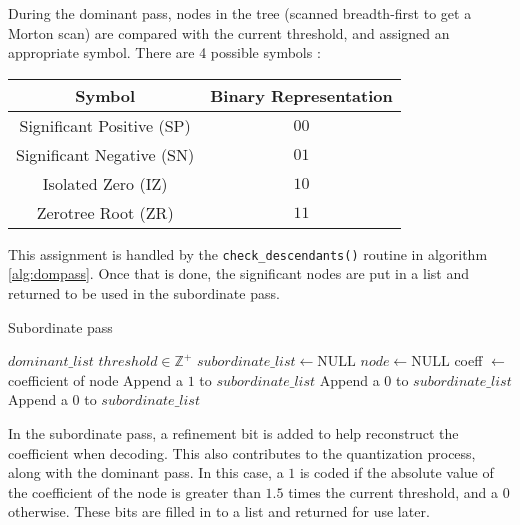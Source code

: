 \documentclass[./A14_Report.tex]{subfiles}
\begin{document}
During the dominant pass, nodes in the tree (scanned breadth-first to get a
Morton scan) are compared with the current threshold, and assigned an
appropriate symbol. There are 4 possible symbols \cite{valezw1999}:\\

\begin{table}[H]
    \centering
    \begin{tabular}{|c|c|}
        \hline
        \textbf{Symbol} & \textbf{Binary Representation}\\
        \hline
        Significant Positive (SP) & $00$\\
        Significant Negative (SN) & $01$\\
        Isolated Zero (IZ) & $10$\\
        Zerotree Root (ZR) & $11$\\
        \hline
    \end{tabular}
\end{table}

This assignment is handled by the \texttt{check_descendants()} routine in
algorithm \ref{alg:dompass}. Once that is done, the significant nodes are put
in a list and returned to be used in the subordinate pass.

\begin{algorithm}[H]
    \caption{Subordinate pass}
    \label{alg:subpass}
    \begin{algorithmic}
        \Require $dominant\_list$
        \Require $threshold \in \mathbb{Z}^+$
        \State $subordinate\_list \gets \text{NULL}$
        \State $node \gets \text{NULL}$
            \State coeff $\gets$ coefficient of node
                    \State Append a $1$ to $subordinate\_list$
                \Else
                    \State Append a $0$ to $subordinate\_list$
                \EndIf
            \Else
                \State Append a $0$ to $subordinate\_list$
            \EndIf
        \EndFor
    \end{algorithmic}
\end{algorithm}

In the subordinate pass, a refinement bit is added to help reconstruct the
coefficient when decoding. This also contributes to the quantization process,
along with the dominant pass. In this case, a $1$ is coded if the absolute
value of the coefficient of the node is greater than $1.5$ times the current
threshold, and a $0$ otherwise. These bits are filled in to a list and returned
for use later.
\end{document}
